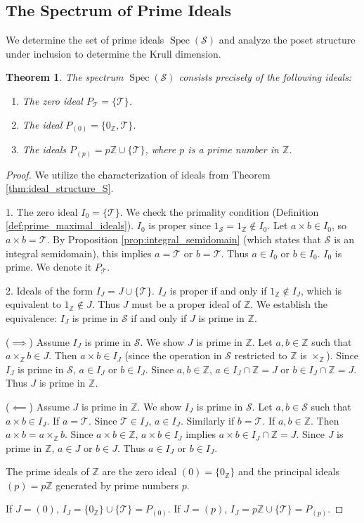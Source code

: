 \documentclass[11pt, a4paper]{article}
\theoremstyle{plain}
\newtheorem{theorem}{Theorem}[section]
\theoremstyle{definition}
\numberwithin{equation}{section}
\newcommand{\Z}{\mathbb{Z}}
\newcommand{\Tobj}{\mathcal{T}} %
\newcommand{\SemiringS}{\mathcal{S}}
\DeclareMathOperator{\Spec}{Spec}
\begin{document}
\subsection{The Spectrum of Prime Ideals}

We determine the set of prime ideals $\Spec(\SemiringS)$ and analyze the poset structure under inclusion to determine the Krull dimension.

\begin{theorem}\label{thm:prime_ideals_S}
The spectrum $\Spec(\SemiringS)$ consists precisely of the following ideals:
\begin{enumerate}
    \item The zero ideal $P_{\Tobj} = \{\Tobj\}$.
    \item The ideal $P_{(0)} = \{0_{\Z}, \Tobj\}$.
    \item The ideals $P_{(p)} = p\Z \cup \{\Tobj\}$, where $p$ is a prime number in $\Z$.
\end{enumerate}
\end{theorem}
\begin{proof}
We utilize the characterization of ideals from Theorem \ref{thm:ideal_structure_S}.

1. The zero ideal $I_0 = \{\Tobj\}$.
We check the primality condition (Definition \ref{def:prime_maximal_ideals}). $I_0$ is proper since $1_{\SemiringS}=1_{\Z} \notin I_0$.
Let $a\times b \in I_0$, so $a\times b = \Tobj$. By Proposition \ref{prop:integral_semidomain} (which states that $\SemiringS$ is an integral semidomain), this implies $a=\Tobj$ or $b=\Tobj$. Thus $a \in I_0$ or $b \in I_0$. $I_0$ is prime. We denote it $P_{\Tobj}$.

2. Ideals of the form $I_J = J \cup \{\Tobj\}$. $I_J$ is proper if and only if $1_{\Z} \notin I_J$, which is equivalent to $1_{\Z} \notin J$. Thus $J$ must be a proper ideal of $\Z$.
We establish the equivalence: $I_J$ is prime in $\SemiringS$ if and only if $J$ is prime in $\Z$.

($\implies$) Assume $I_J$ is prime in $\SemiringS$. We show $J$ is prime in $\Z$. Let $a, b \in \Z$ such that $a\times_{\Z} b \in J$.
Then $a\times b \in I_J$ (since the operation in $\SemiringS$ restricted to $\Z$ is $\times_{\Z}$). Since $I_J$ is prime in $\SemiringS$, $a \in I_J$ or $b \in I_J$. Since $a, b \in \Z$, $a \in I_J \cap \Z = J$ or $b \in I_J \cap \Z = J$. Thus $J$ is prime in $\Z$.

($\impliedby$) Assume $J$ is prime in $\Z$. We show $I_J$ is prime in $\SemiringS$. Let $a, b \in \SemiringS$ such that $a\times b \in I_J$.
If $a=\Tobj$. Since $\Tobj \in I_J$, $a \in I_J$. Similarly if $b=\Tobj$.
If $a, b \in \Z$. Then $a\times b = a\times_{\Z} b$. Since $a\times b \in \Z$, $a\times b \in I_J$ implies $a\times b \in I_J \cap \Z = J$.
Since $J$ is prime in $\Z$, $a \in J$ or $b \in J$. Thus $a \in I_J$ or $b \in I_J$.

The prime ideals of $\Z$ are the zero ideal $(0)=\{0_{\Z}\}$ and the principal ideals $(p)=p\Z$ generated by prime numbers $p$.

If $J=(0)$, $I_J = \{0_{\Z}\} \cup \{\Tobj\} = P_{(0)}$.
If $J=(p)$, $I_J = p\Z \cup \{\Tobj\} = P_{(p)}$.
\end{proof}
\end{document}
